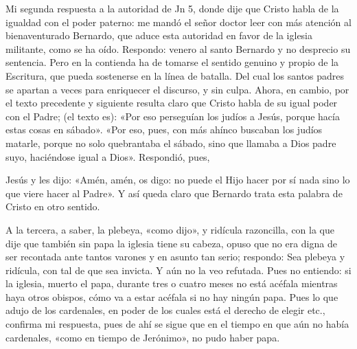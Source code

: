 Mi segunda respuesta a la autoridad de Jn 5, donde dije que Cristo habla de la igualdad con el poder paterno: me mandó el señor doctor leer con más atención \marginpar{\small[264]} al bienaventurado Bernardo, que aduce esta autoridad en favor de la iglesia militante, como se ha oído. Respondo: venero al santo Bernardo y no desprecio su sentencia. Pero en la contienda ha de tomarse el sentido genuino y propio de la Escritura, que pueda sostenerse en la línea de batalla. Del cual los santos padres se apartan a veces para enriquecer el discurso, y sin culpa. Ahora, en cambio, por el texto precedente y siguiente resulta claro que Cristo habla de su igual poder con el Padre; (el texto es): «Por eso perseguían los judíos a Jesús, porque hacía estas cosas en sábado». «Por eso, pues, con más ahínco buscaban los judíos matarle, porque no solo quebrantaba el sábado, sino que llamaba a Dios padre suyo, haciéndose igual a Dios». Respondió, pues,

Jesús y les dijo: «Amén, amén, os digo: no puede el Hijo hacer por sí nada sino lo que viere hacer al Padre». Y así queda claro que Bernardo trata esta palabra de Cristo en otro sentido.

A la tercera, a saber, la plebeya, «como dijo», y ridícula razoncilla, con la que dije que también sin papa la iglesia tiene su cabeza, opuso que no era digna de ser recontada ante tantos varones y en asunto tan serio; respondo: Sea plebeya y ridícula, con tal de que sea invicta. Y aún no la veo refutada. Pues no entiendo: si la iglesia, muerto el papa, durante tres o cuatro meses no está acéfala mientras haya otros obispos, cómo va a estar acéfala si no hay ningún papa. Pues lo que adujo de los cardenales, en poder de los cuales está el derecho de elegir etc., confirma mi respuesta, pues de ahí se sigue que en el tiempo en que aún no había cardenales, «como en tiempo de Jerónimo», no pudo haber papa.

